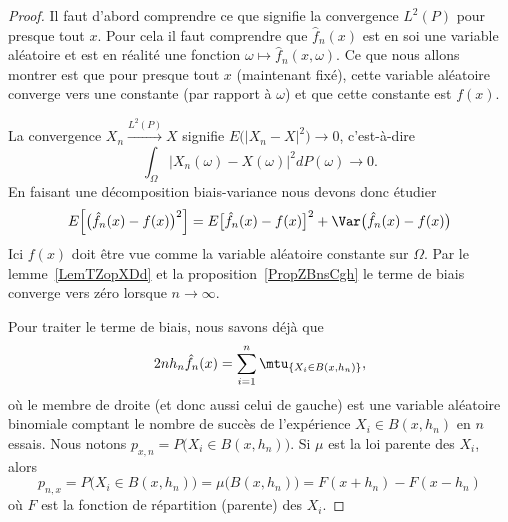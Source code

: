 \begin{proof}
	Il faut d'abord comprendre ce que signifie la convergence \( L^2(P)\) pour presque tout \( x\). Pour cela il faut comprendre que \( \hat f_n(x)\) est en soi une variable aléatoire et est en réalité une fonction \( \omega\mapsto \hat f_n(x,\omega)\). Ce que nous allons montrer est que pour presque tout \( x\) (maintenant fixé), cette variable aléatoire converge vers une constante (par rapport à \( \omega\)) et que cette constante est \( f(x)\).

	La convergence \( X_n\stackrel{L^2(P)}{\to}X\) signifie \( E\big( | X_n-X |^2 \big)\to 0\), c'est-à-dire
	\begin{equation}
		\int_{\Omega}\big| X_n(\omega)-X(\omega) \big|^2dP(\omega)\to 0.
	\end{equation}
	En faisant une décomposition biais-variance nous devons donc étudier
	\begin{equation}
		E\Big[ \big( \hat f_n(x)-f(x) \big)^2 \Big]=E\big[ \hat f_n(x)-f(x) \big]^2+\Var\big( \hat f_n(x)-f(x) \big)
	\end{equation}
	Ici \( f(x)\) doit être vue comme la variable aléatoire constante sur \( \Omega\). Par le lemme~\ref{LemTZopXDd} et la proposition~\ref{PropZBnsCgh} le terme de biais converge vers zéro lorsque \( n\to \infty\).

	Pour traiter le terme de biais, nous savons déjà que
	\begin{equation}
		2nh_n\hat f_n(x)=\sum_{i=1}^n\mtu_{\{ X_i\in B(x,h_n) \}},
	\end{equation}
	où le membre de droite (et donc aussi celui de gauche) est une variable aléatoire binomiale comptant le nombre de succès de l'expérience \( X_i\in B(x,h_n)\) en \( n\) essais. Nous notons \( p_{x,n}=P\big( X_i\in B(x,h_n) \big)\). Si \( \mu\) est la loi parente des \( X_i\), alors
	\begin{equation}    \label{EqKBKrSHJ}
		p_{n,x}=P\big( X_i\in B(x,h_n) \big)=\mu\big( B(x,h_n) \big)=F(x+h_n)-F(x-h_n)
	\end{equation}
	où \( F\) est la fonction de répartition (parente) des \( X_i\).


\end{proof}
